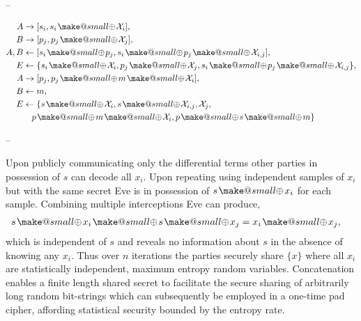 \documentclass[twocolumn, aps, amsmath, amssymb, nofootinbib, superscriptaddress, longbibliography, doublefloatfix, table-of-contents, eqsecnum, rmp]{revtex4-2}
\makeatletter
\newcommand{\soplus}{{{\hspace{1pt}}{\mathbin{\mathpalette\make@small{\mathbin\oplus}}}}{\hspace{1pt}}}
\newcommand{\make@small}[2]{%
  \vcenter{\hbox{%
    \scalebox{0.6}{$\m@th#1#2$}%
  }}%
}
\makeatother
\begin{document}
--

\begin{align}
	A &\to [s_i,s_i\soplus \mathcal{X}_i], \nonumber\\	
	B &\to [p_j,p_j\soplus \mathcal{X}_j], \nonumber\\	
	A,B &\gets [s_i \soplus p_j, s_i\soplus p_j\soplus \mathcal{X}_{i,j}],\nonumber\\
	E &\gets \{s_i \soplus \mathcal{X}_i, p_j \soplus \mathcal{X}_j,s_i \soplus p_j \soplus \mathcal{X}_{i,j} \},\nonumber\\
	A &\to [p_j, p_j \soplus m\soplus \mathcal{X}_i],\nonumber\\
	B &\gets m,\nonumber\\
	E &\gets \{s\soplus \mathcal{X}_i, s \soplus \mathcal{X}_{i,j},\mathcal{X}_j,\nonumber\\
	&\quad p\soplus m \soplus \mathcal{X}_i, p\soplus s\soplus m \} 
\end{align}


--

Upon publicly communicating only the differential terms other parties in possession of $s$ can decode all $x_i$. Upon repeating using independent samples of $x_i$ but with the same secret Eve is in possession of $s\soplus x_i$ for each sample. Combining multiple interceptions Eve can produce,
\begin{align}
	s\soplus x_i \soplus s \soplus x_j &= x_i \soplus x_j,
\end{align}
which is independent of $s$ and reveals no information about $s$ in the absence of knowing any $x_i$. Thus over $n$ iterations the parties securely share $\{x\}$ where all $x_i$ are statistically independent, maximum entropy random variables. Concatenation enables a finite length shared secret to facilitate the secure sharing of arbitrarily long random bit-strings which can subsequently be employed in a one-time pad cipher, affording statistical security bounded by the entropy rate.
\end{document}
